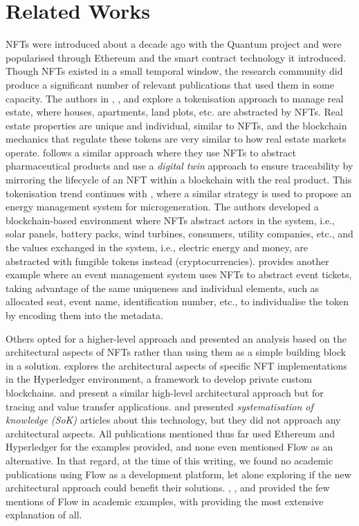\documentclass[../NFTComp_IEEE.tex]{subfiles}
\begin{document}
\section{Related Works}
\label{sec:related_works}
NFTs were introduced about a decade ago with the Quantum project \cite{Exmundo2023} and were popularised through Ethereum and the smart contract technology it introduced. Though NFTs existed in a small temporal window, the research community did produce a significant number of relevant publications that used them in some capacity. The authors in \cite{Hung2023}, \cite{Barbuta2024}, and \cite{Sharma2024} explore a tokenisation approach to manage real estate, where houses, apartments, land plots, etc. are abstracted by NFTs. Real estate properties are unique and individual, similar to NFTs, and the blockchain mechanics that regulate these tokens are very similar to how real estate markets operate. \cite{Chiacchio2022} follows a similar approach where they use NFTs to abstract pharmaceutical products and use a \textit{digital twin} approach to ensure traceability by mirroring the lifecycle of an NFT within a blockchain with the real product. This tokenisation trend continues with \cite{Karandikar2021}, where a similar strategy is used to propose an energy management system for microgeneration. The authors developed a blockchain-based environment where NFTs abstract actors in the system, i.e., solar panels, battery packs, wind turbines, consumers, utility companies, etc., and the values exchanged in the system, i.e., electric energy and money, are abstracted with fungible tokens instead (cryptocurrencies). \cite{Regner2019} provides another example where an event management system uses NFTs to abstract event tickets, taking advantage of the same uniqueness and individual elements, such as allocated seat, event name, identification number, etc., to individualise the token by encoding them into the metadata.
\par
Others opted for a higher-level approach and presented an analysis based on the architectural aspects of NFTs rather than using them as a simple building block in a solution. \cite{Hong2019} explores the architectural aspects of specific NFT implementations in the Hyperledger environment, a framework to develop private custom blockchains. \cite{Yang2022} and \cite{Bal2019} present a similar high-level architectural approach but for tracing and value transfer applications. \cite{Wang2021b} and \cite{Ma2023} presented \textit{systematisation of knowledge (SoK)} articles about this technology, but they did not approach any architectural aspects. All publications mentioned thus far used Ethereum and Hyperledger for the examples provided, and none even mentioned Flow as an alternative. In that regard, at the time of this writing, we found no academic publications using Flow as a development platform, let alone exploring if the new architectural approach could benefit their solutions. \cite{Wang2021}, \cite{Razi2024}, and \cite{Guidi2023} provided the few mentions of Flow in academic examples, with \cite{Guidi2023} providing the most extensive explanation of all.
\end{document}
